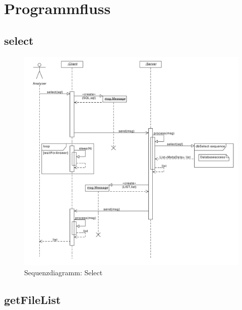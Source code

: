 \section{Programmfluss}

\subsection {select}

\begin{figure}[h]
	\centering
	\label{dia:design:frontend:sqc:select}
	\includegraphics[width=\textwidth]{design/frontend/sequence/select-sequence.pdf}
	\caption{Sequenzdiagramm: Select}
\end{figure}

\subsection {getFileList}

